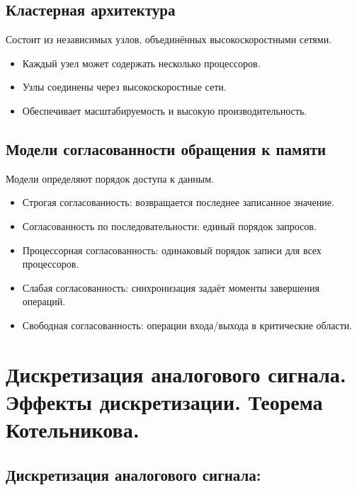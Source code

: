 	\subsection{Кластерная архитектура}
	Состоит из независимых узлов, объединённых высокоскоростными сетями.
	\begin{itemize}
		\item Каждый узел может содержать несколько процессоров.
		\item Узлы соединены через высокоскоростные сети.
		\item Обеспечивает масштабируемость и высокую производительность.
	\end{itemize}
	
	\subsection{Модели согласованности обращения к памяти}
	Модели определяют порядок доступа к данным.
	\begin{itemize}
		\item Строгая согласованность: возвращается последнее записанное значение.
		\item Согласованность по последовательности: единый порядок запросов.
		\item Процессорная согласованность: одинаковый порядок записи для всех процессоров.
		\item Слабая согласованность: синхронизация задаёт моменты завершения операций.
		\item Свободная согласованность: операции входа/выхода в критические области.
	\end{itemize}
	
	\newpage
	
	\section{Дискретизация аналогового сигнала. Эффекты дискретизации. Теорема Котельникова.}
	\vspace{-1em}
	\subsection{Дискретизация аналогового сигнала:}
	
